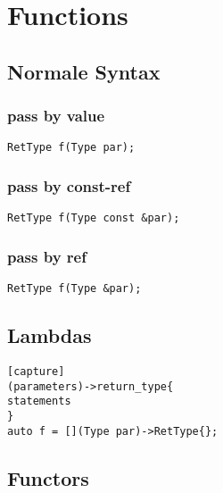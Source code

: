\section{Functions}
\label{Function}

\subsection{Normale Syntax}
\subsubsection{pass by value}
\begin{lstlisting}
RetType f(Type par);
\end{lstlisting}
\subsubsection{pass by const-ref}
\begin{lstlisting}
RetType f(Type const &par);
\end{lstlisting}
\subsubsection{pass by ref}
\begin{lstlisting}
RetType f(Type &par);
\end{lstlisting}

\subsection{Lambdas}
\label{Lambda}
\begin{lstlisting}
[capture]
(parameters)->return_type{
statements
}
auto f = [](Type par)->RetType{};
\end{lstlisting}

\subsection{Functors}

